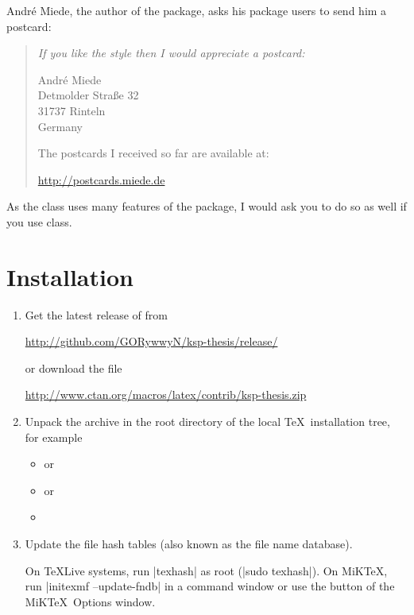 \pagebreak %
André Miede, the author of the  package, asks his package users to send him a postcard:
\begin{quote}\itshape
   If you like the style then I would appreciate a postcard:
   \begin{center}
    André Miede \\
    Detmolder Straße 32 \\
    31737 Rinteln \\
    Germany
   \end{center}
   The postcards I received so far are available at:
   \begin{center}
    \url{http://postcards.miede.de}
   \end{center}
\end{quote}
As the  class uses many features of the  package, I would ask you to do so as well if you use  class.

\section{Installation}

\begin{enumerate}
   \item Get the latest release of  from

      \url{http://github.com/GORywwyN/ksp-thesis/release/}

   or download the file

      \url{http://www.ctan.org/macros/latex/contrib/ksp-thesis.zip}

   \item Unpack the archive in the root directory of the local \TeX\ installation tree, for example
   
   \begin{itemize}
      \item {} or
      \item {} or
      \item {}
   \end{itemize}

\item Update the file hash tables (also known as the file name database).
   
   On \TeX Live systems, run |texhash| as root (|sudo texhash|). On MiK\TeX, run |initexmf --update-fndb| in a command window or use the  button of the MiK\TeX\ Options window.
\end{enumerate}


